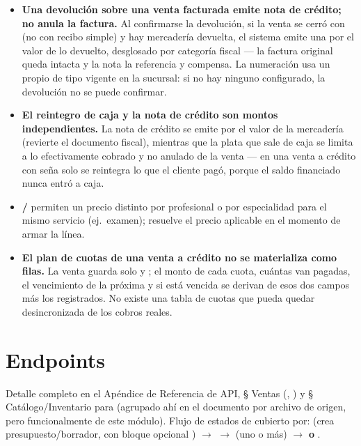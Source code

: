\begin{itemize}
  \item \textbf{Una devolución sobre una venta facturada emite nota de crédito; no anula la factura.} Al confirmarse la devolución, si la venta se cerró con  (no con recibo simple) y hay mercadería devuelta, el sistema emite una  por el valor de lo devuelto, desglosado por categoría fiscal --- la factura original queda intacta y la nota la referencia y compensa. La numeración usa un  propio de tipo  vigente en la sucursal: si no hay ninguno configurado, la devolución no se puede confirmar.
  \item \textbf{El reintegro de caja y la nota de crédito son montos independientes.} La nota de crédito se emite por el valor de la mercadería (revierte el documento fiscal), mientras que la plata que sale de caja se limita a lo efectivamente cobrado y no anulado de la venta --- en una venta a crédito con seña solo se reintegra lo que el cliente pagó, porque el saldo financiado nunca entró a caja.
  \item \textbf{/} permiten un precio distinto por profesional o por especialidad para el mismo servicio (ej.\ examen); \allowbreak {} resuelve el precio aplicable en el momento de armar la línea.
  \item \textbf{El plan de cuotas de una venta a crédito no se materializa como filas.} La venta guarda solo  y ; el monto de cada cuota, cuántas van pagadas, el vencimiento de la próxima y si está vencida se derivan de esos dos campos más los  registrados. No existe una tabla de cuotas que pueda quedar desincronizada de los cobros reales.
\end{itemize}

\section{Endpoints}
\label{sec:08-endpoints}

Detalle completo en el Apéndice de Referencia de API, § Ventas (, \allowbreak {}) y § Catálogo/Inventario para \allowbreak {} (agrupado ahí en el documento por archivo de origen, pero funcionalmente de este módulo). Flujo de estados de  cubierto por:  (crea presupuesto/borrador, con bloque opcional ) $\rightarrow$  $\rightarrow$  (uno o más) $\rightarrow$  \textbf{o} .

